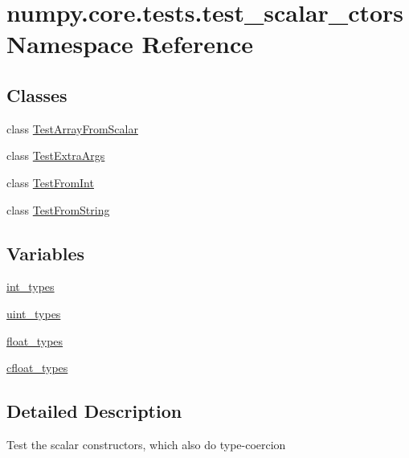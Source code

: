 \hypertarget{namespacenumpy_1_1core_1_1tests_1_1test__scalar__ctors}{}\section{numpy.\+core.\+tests.\+test\+\_\+scalar\+\_\+ctors Namespace Reference}
\label{namespacenumpy_1_1core_1_1tests_1_1test__scalar__ctors}
\subsection*{Classes}
\begin{DoxyCompactItemize}
\item 
class \hyperlink{classnumpy_1_1core_1_1tests_1_1test__scalar__ctors_1_1TestArrayFromScalar}{Test\+Array\+From\+Scalar}
\item 
class \hyperlink{classnumpy_1_1core_1_1tests_1_1test__scalar__ctors_1_1TestExtraArgs}{Test\+Extra\+Args}
\item 
class \hyperlink{classnumpy_1_1core_1_1tests_1_1test__scalar__ctors_1_1TestFromInt}{Test\+From\+Int}
\item 
class \hyperlink{classnumpy_1_1core_1_1tests_1_1test__scalar__ctors_1_1TestFromString}{Test\+From\+String}
\end{DoxyCompactItemize}
\subsection*{Variables}
\begin{DoxyCompactItemize}
\item 
\hyperlink{namespacenumpy_1_1core_1_1tests_1_1test__scalar__ctors_a31197f5f1f302d290dc42d10104fec7e}{int\+\_\+types}
\item 
\hyperlink{namespacenumpy_1_1core_1_1tests_1_1test__scalar__ctors_a5a4e2be695f230ba5f747f537e79a942}{uint\+\_\+types}
\item 
\hyperlink{namespacenumpy_1_1core_1_1tests_1_1test__scalar__ctors_a2d45ef141ee7b0e70ce9f732291cde66}{float\+\_\+types}
\item 
\hyperlink{namespacenumpy_1_1core_1_1tests_1_1test__scalar__ctors_ae162c3d0b654c7c35aa1a0ba4e442aad}{cfloat\+\_\+types}
\end{DoxyCompactItemize}


\subsection{Detailed Description}
\begin{DoxyVerb}Test the scalar constructors, which also do type-coercion
\end{DoxyVerb}
 


